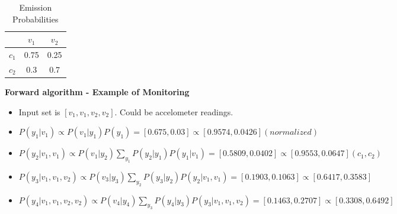 \documentclass[parskip=half]{scrartcl}
\begin{document}
\begin{itemize}
\begin{itemize}
\begin{itemize}
                            \begin{table}[ht]
                                \centering
                                \begin{tabular}{| l | c c |}
                                    \hline
                                    \textbf{} & \textbf{$v_1$} & \textbf{$v_2$} \\
                                    \hline\hline
                                        $c_1$ & 0.75 & 0.25 \\
                                    \hline
                                        $c_2$ & 0.3 & 0.7 \\
                                    \hline
                                \end{tabular}
                                \caption{Emission Probabilities}
                                \label{tab:emission_probabilities}
                            \end{table}
                        \end{itemize}
                \end{itemize}
        \end{itemize}

        \textbf{Forward algorithm - Example of Monitoring}
        \begin{itemize}
            \item Input set is $[v_1, v_1, v_2, v_2]$. Could be accelometer readings.
            \item $P(y_1|v_1) \propto P(v_1|y_1)P(y_1) = [0.675, 0.03] \propto [0.9574,  0.0426] (normalized) $
            \item $P(y_2|v_1, v_1) \propto P(v_1|y_2) \sum_{y_1} P(y_2|y_1) P(y_1|v_1) = [0.5809, 0.0402] \propto [0.9553, 0.0647] (c_1, c_2) $
            \item $P(y_3|v_1, v_1, v_2) \propto P(v_3|y_3) \sum_{y_2} P(y_3|y_2) P(y_2|v_1, v_1) = [0.1903, 0.1063] \propto [0.6417, 0.3583] $
            \item $P(y_4|v_1, v_1, v_2, v_2) \propto P(v_4|y_4) \sum_{y_3} P(y_4|y_3) P(y_3|v_1, v_1, v_2) = [0.1463, 0.2707] \propto [0.3308, 0.6492] $
        \end{itemize}
        
\end{document}
